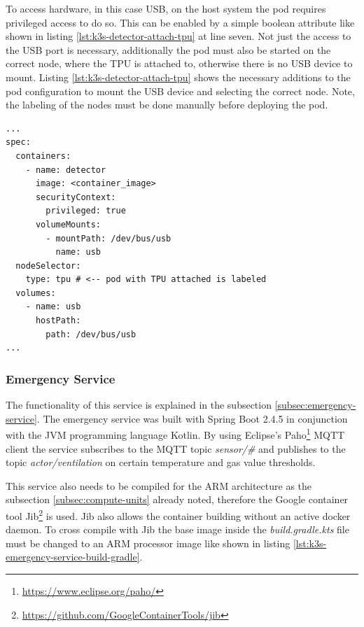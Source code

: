 \bigskip
To access hardware, in this case USB, on the host system the pod requires privileged access to do so. This can be enabled by a simple boolean attribute like shown in listing \ref{lst:k3s-detector-attach-tpu} at line seven. Not just the access to the USB port is necessary, additionally the pod must also be started on the correct node, where the TPU is attached to, otherwise there is no USB device to mount. Listing \ref{lst:k3s-detector-attach-tpu} shows the necessary additions to the pod configuration to mount the USB device and selecting the correct node. Note, the labeling of the nodes must be done manually before deploying the pod.

\begin{lstlisting}[caption={Give detector pod access to via USB attached TPU.},label={lst:k3s-detector-attach-tpu},captionpos=b]
...
spec:
  containers:
    - name: detector
      image: <container_image>
      securityContext:
        privileged: true
      volumeMounts:
        - mountPath: /dev/bus/usb
          name: usb
  nodeSelector:
    type: tpu # <-- pod with TPU attached is labeled 
  volumes:
    - name: usb
      hostPath:
        path: /dev/bus/usb
...
\end{lstlisting}
\subsubsection*{Emergency Service}
The functionality of this service is explained in the subsection \ref{subsec:emergency-service}. The emergency service was built with Spring Boot 2.4.5 in conjunction with the \gls{JVM} programming language Kotlin. By using Eclipse's Paho\footnote{\url{https://www.eclipse.org/paho/}} \gls{MQTT} client the service subscribes to the MQTT topic \textit{sensor/\#} and publishes to the topic \textit{actor/ventilation} on certain temperature and gas value thresholds.

\bigskip
This service also needs to be compiled for the ARM architecture as the subsection \ref{subsec:compute-units} already noted, therefore the Google container tool Jib\footnote{\url{https://github.com/GoogleContainerTools/jib}} is used. Jib also allows the container building without an active docker daemon. To cross compile with Jib the base image inside the \textit{build.gradle.kts} file must be changed to an ARM processor image like shown in listing \ref{lst:k3s-emergency-service-build-gradle}.

